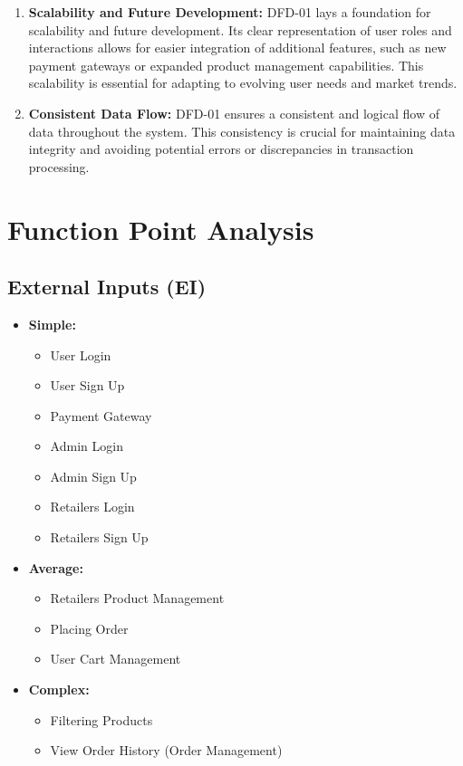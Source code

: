 \documentclass[a4paper,12pt]{article}
\begin{document}
\begin{enumerate}
  \item \textbf{Scalability and Future Development:} DFD-01 lays a foundation for scalability and future development. Its clear representation of user roles and interactions allows for easier integration of additional features, such as new payment gateways or expanded product management capabilities. This scalability is essential for adapting to evolving user needs and market trends.

  \item \textbf{Consistent Data Flow:} DFD-01 ensures a consistent and logical flow of data throughout the system. This consistency is crucial for maintaining data integrity and avoiding potential errors or discrepancies in transaction processing.

\end{enumerate}
\section{Function Point Analysis}

\subsection{External Inputs (EI)}
\begin{itemize}
    \item \textbf{Simple:} 
    \begin{itemize}
        \item User Login
        \item User Sign Up
        \item Payment Gateway
        \item Admin Login
        \item Admin Sign Up
        \item Retailers Login
        \item Retailers Sign Up
    \end{itemize}

    \item \textbf{Average:} 
    \begin{itemize}
        \item Retailers Product Management
        \item Placing Order
        \item User Cart Management
    \end{itemize}

    \item \textbf{Complex:} 
    \begin{itemize}
        \item Filtering Products
        \item View Order History (Order Management)
    \end{itemize}
\end{itemize}
\end{document}
